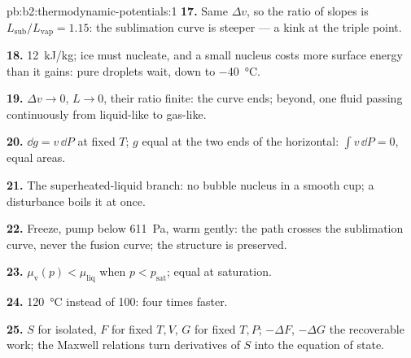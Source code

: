 \begin{solution}{pb:b2:thermodynamic-potentials:1}
\textbf{17.} Same $\Delta v$, so the ratio of slopes is $L_{\text{sub}}/L_{\text{vap}}
= 1.15$: the sublimation curve is steeper --- a kink at the triple point.

\textbf{18.} \qty{12}{kJ/kg}; ice must nucleate, and a small nucleus costs
more surface energy than it gains: pure droplets wait, down to
\qty{-40}{\celsius}.

\textbf{19.} $\Delta v \to 0$, $L \to 0$, their ratio finite: the curve ends;
beyond, one fluid passing continuously from liquid-like to gas-like.

\textbf{20.} $\dd g = v\,\dd P$ at fixed $T$; $g$ equal at the two ends of
the horizontal: $\int v\,\dd P = 0$, equal areas.

\textbf{21.} The superheated-liquid branch: no bubble nucleus in a
smooth cup; a disturbance boils it at once.

\textbf{22.} Freeze, pump below \qty{611}{Pa}, warm gently: the path
crosses the sublimation curve, never the fusion curve; the structure
is preserved.

\textbf{23.} $\mu_{\text{v}}(p) < \mu_{\text{liq}}$ when $p < p_{\text{sat}}$; equal at
saturation.

\textbf{24.} \qty{120}{\celsius} instead of \qty{100}{}: four times faster.

\textbf{25.} $S$ for isolated, $F$ for fixed $T,V$, $G$ for fixed $T,P$;
$-\Delta F$, $-\Delta G$ the recoverable work; the Maxwell relations turn
derivatives of $S$ into the equation of state.
\end{solution}
